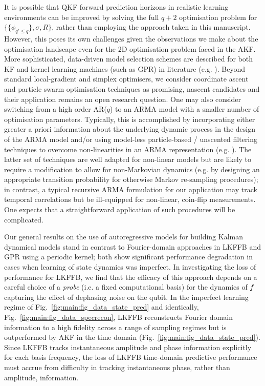 It is possible that QKF forward prediction horizons in realistic learning environments can be improved by solving the full $q+2$ optimisation problem for $\{\{ \phi_{q' \leq q}\}, \sigma, R\}$, rather than employing the approach taken in this manuscript. However, this poses its own challenges given the observations we make about the optimisation landscape even for the 2D optimisation problem faced in the AKF.  More sophisticated, data-driven model selection schemes are described for both KF and kernel learning machines (such as GPR) in literature (e.g. \cite{arlot2009data, vu2015understanding}). Beyond standard local-gradient and simplex optimisers, we consider coordinate ascent \cite{abbeel2005} and particle swarm optimisation techniques \cite{robertson2017particle} as promising, nascent candidates and their application remains an open research question. One may also consider switching from a high order AR($q$) to an ARMA model with a smaller number of optimisation parameters. Typically, this is accomplished by incorporating either greater a priori information about the underlying dynamic process in the design of the ARMA model and/or using model-less particle-based / unscented filtering techniques to overcome non-linearities in an ARMA representation (e.g. \cite{dong2009unscented}). The latter set of techniques are well adapted for non-linear models but are likely to require a modification to allow for non-Markovian dynamics (e.g. by designing an appropriate transition probability for otherwise Markov re-sampling procedures); in contrast, a typical recursive ARMA formulation for our application may track temporal correlations but be ill-equipped for non-linear, coin-flip measurements. One expects that a straightforward application of such procedures will be complicated.

Our general results on the use of autoregressive models for building Kalman dynamical models stand in contrast to Fourier-domain approaches in LKFFB and GPR using a periodic kernel;  both show significant performance degradation in cases when learning of state dynamics was imperfect.  In investigating the loss of performance for LKFFB, we find that the efficacy of this approach depends on a careful choice of a \textit{probe} (i.e. a fixed computational basis) for the dynamics of $f$ capturing the effect of dephasing noise on the qubit.  In the imperfect learning regime of Fig.~\ref{fig:main:fig_data_state_pred} and identically, Fig.~\ref{fig:main:fig_data_specrecon}, LKFFB reconstructs Fourier domain information to a high fidelity across a range of sampling regimes but is outperformed by AKF in the time domain (Fig.~\ref{fig:main:fig_data_state_pred}). Since LKFFB tracks instantaneous amplitude and phase information explicitly for each basis frequency, the loss of LKFFB time-domain predictive performance must accrue from difficulty in tracking instantaneous phase, rather than amplitude, information. 

